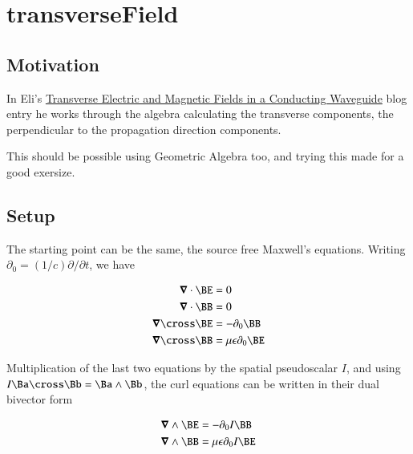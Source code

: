 

\chapter{transverseField}
\label{chap:transverseField}
{}
\date{July 30, 2009}

\beginArtWithToc

\section{Motivation}

In Eli's \href{http://behindtheguesses.blogspot.com/2009/07/transverse-electric-and-magnetic-fields.html}{Transverse Electric and Magnetic Fields in a Conducting Waveguide} blog entry he works through the algebra calculating the transverse components, the perpendicular to the propagation direction components.

This should be possible using Geometric Algebra too, and trying this made for a good exersize.

\section{Setup}

The starting point can be the same, the source free Maxwell's equations.  Writing $\partial_0 = (1/c) \partial/{\partial t}$, we have

\begin{align}
\spacegrad \cdot \BE &= 0 \\
\spacegrad \cdot \BB &= 0 \\
\spacegrad \cross \BE &= - \partial_0 \BB \\
\spacegrad \cross \BB &= \mu \epsilon \partial_0 \BE
\end{align}

Multiplication of the last two equations by the spatial pseudoscalar $I$, and using $I \Ba \cross \Bb = \Ba \wedge \Bb$, the curl equations can be written in their dual bivector form

\begin{align}
\spacegrad \wedge \BE &= - \partial_0 I \BB \\
\spacegrad \wedge \BB &= \mu \epsilon \partial_0 I \BE
\end{align}

